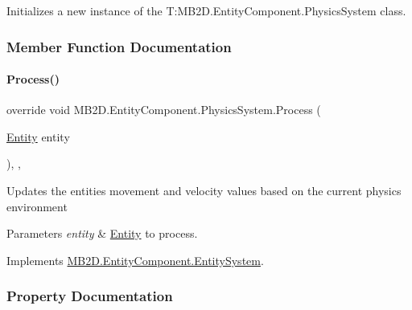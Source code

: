 Initializes a new instance of the T\+:\+M\+B2\+D.\+Entity\+Component.\+Physics\+System class. 



\subsubsection{Member Function Documentation}
\hypertarget{class_m_b2_d_1_1_entity_component_1_1_physics_system_ab8398d3b16f49e684f55649877f645c0}{}\label{class_m_b2_d_1_1_entity_component_1_1_physics_system_ab8398d3b16f49e684f55649877f645c0} 
\paragraph{\texorpdfstring{Process()}{Process()}}
{\footnotesize\ttfamily override void M\+B2\+D.\+Entity\+Component.\+Physics\+System.\+Process (\begin{DoxyParamCaption}\item[{\hyperlink{class_m_b2_d_1_1_entity_component_1_1_entity}{Entity}}]{entity }\end{DoxyParamCaption})\hspace{0.3cm}{\ttfamily [inline]}, {\ttfamily [protected]}, {\ttfamily [virtual]}}



Updates the entities movement and velocity values based on the current physics environment 


\begin{DoxyParams}{Parameters}
{\em entity} & \hyperlink{class_m_b2_d_1_1_entity_component_1_1_entity}{Entity} to process.\\
\hline
\end{DoxyParams}


Implements \hyperlink{class_m_b2_d_1_1_entity_component_1_1_entity_system_abbf83b87cb5d12754fb058cef50451fa}{M\+B2\+D.\+Entity\+Component.\+Entity\+System}.



\subsubsection{Property Documentation}
\hypertarget{class_m_b2_d_1_1_entity_component_1_1_physics_system_aa3340a463c0cc2dd1c765c350352c213}{}\label{class_m_b2_d_1_1_entity_component_1_1_physics_system_aa3340a463c0cc2dd1c765c350352c213} 
